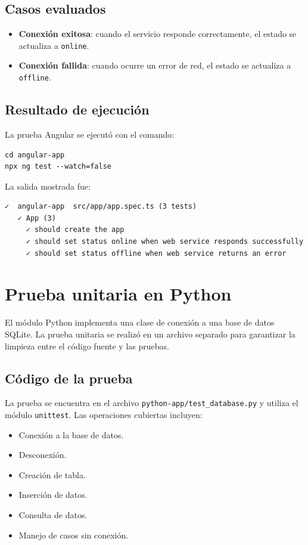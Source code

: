 \documentclass[12pt]{article}
\begin{document}
\subsection{Casos evaluados}
\begin{itemize}
    \item \textbf{Conexión exitosa}: cuando el servicio responde correctamente, el estado se actualiza a \texttt{online}.
    \item \textbf{Conexión fallida}: cuando ocurre un error de red, el estado se actualiza a \texttt{offline}.
\end{itemize}

\subsection{Resultado de ejecución}
La prueba Angular se ejecutó con el comando:
\begin{verbatim}
cd angular-app
npx ng test --watch=false
\end{verbatim}

\noindent La salida mostrada fue:
\begin{verbatim}
✓  angular-app  src/app/app.spec.ts (3 tests)
   ✓ App (3)
     ✓ should create the app
     ✓ should set status online when web service responds successfully
     ✓ should set status offline when web service returns an error
\end{verbatim}

\section{Prueba unitaria en Python}
El módulo Python implementa una clase de conexión a una base de datos SQLite. La prueba unitaria se realizó en un archivo separado para garantizar la limpieza entre el código fuente y las pruebas.

\subsection{Código de la prueba}
La prueba se encuentra en el archivo \texttt{python-app/test_database.py} y utiliza el módulo \texttt{unittest}. Las operaciones cubiertas incluyen:
\begin{itemize}
    \item Conexión a la base de datos.
    \item Desconexión.
    \item Creación de tabla.
    \item Inserción de datos.
    \item Consulta de datos.
    \item Manejo de casos sin conexión.
\end{itemize}
\end{document}
